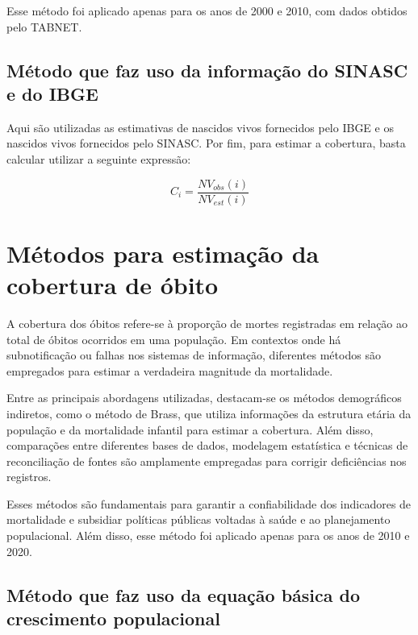 \documentclass[
  12pt,
  a4paper,
]{scrreprt}
\begin{document}
Esse método foi aplicado apenas para os anos de 2000 e 2010, com dados
obtidos pelo TABNET.

\subsection{Método que faz uso da informação do SINASC e do
IBGE}\label{muxe9todo-que-faz-uso-da-informauxe7uxe3o-do-sinasc-e-do-ibge}

Aqui são utilizadas as estimativas de nascidos vivos fornecidos pelo
IBGE e os nascidos vivos fornecidos pelo SINASC. Por fim, para estimar a
cobertura, basta calcular utilizar a seguinte expressão:

\[
C_i = \frac{NV_{obs}\left(i\right)}{NV_{est}\left(i\right)}
\]

\section{Métodos para estimação da cobertura de
óbito}\label{muxe9todos-para-estimauxe7uxe3o-da-cobertura-de-uxf3bito}

A cobertura dos óbitos refere-se à proporção de mortes registradas em
relação ao total de óbitos ocorridos em uma população. Em contextos onde
há subnotificação ou falhas nos sistemas de informação, diferentes
métodos são empregados para estimar a verdadeira magnitude da
mortalidade.

\vspace{12pt}

Entre as principais abordagens utilizadas, destacam-se os métodos
demográficos indiretos, como o método de Brass, que utiliza informações
da estrutura etária da população e da mortalidade infantil para estimar
a cobertura. Além disso, comparações entre diferentes bases de dados,
modelagem estatística e técnicas de reconciliação de fontes são
amplamente empregadas para corrigir deficiências nos registros.

\vspace{12pt}

Esses métodos são fundamentais para garantir a confiabilidade dos
indicadores de mortalidade e subsidiar políticas públicas voltadas à
saúde e ao planejamento populacional. Além disso, esse método foi
aplicado apenas para os anos de 2010 e 2020.

\subsection{Método que faz uso da equação básica do crescimento
populacional}\label{muxe9todo-que-faz-uso-da-equauxe7uxe3o-buxe1sica-do-crescimento-populacional}
\end{document}
